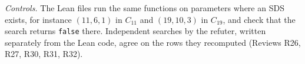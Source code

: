 \emph{Controls.} The Lean files run the same functions on parameters where an SDS exists, for
instance $(11, 6, 1)$ in $C_{11}$ and $(19, 10, 3)$ in $C_{19}$, and check that the search
returns \texttt{false} there. Independent searches by the refuter, written separately from the
Lean code, agree on the rows they recomputed (Reviews R26, R27, R30, R31, R32).
